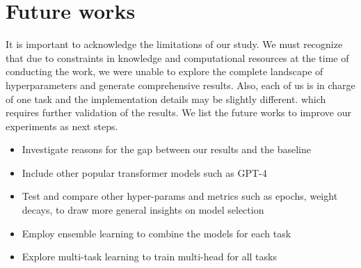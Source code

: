 \documentclass{article}
\begin{document}
\section{Future works}
It is important to acknowledge the limitations of our study. We must recognize that due to constraints in knowledge and computational resources at the time of conducting the work, we were unable to explore the complete landscape of hyperparameters and generate comprehensive results. Also, each of us is in charge of one task and the implementation details may be slightly different. which requires further validation of the results. We list the future works to improve our experiments as next steps. 
\begin{itemize}
    \item Investigate reasons for the gap between our results and the baseline
    \item Include other popular transformer models such as GPT-4
    \item Test and compare other hyper-params and metrics such as epochs, weight decays, to draw more general insights on model selection
    \item Employ ensemble learning to combine the models for each task
    \item Explore multi-task learning to train multi-head for all tasks
\end{itemize}


\end{document}
